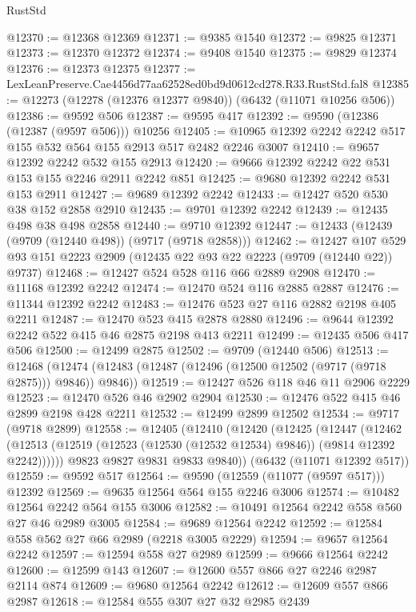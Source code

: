 \begin{lexlean}{RustStd}
\begin{coremodule}
@12370 := @12368 @12369
@12371 := @9385 @1540
@12372 := @9825 @12371
@12373 := @12370 @12372
@12374 := @9408 @1540
@12375 := @9829 @12374
@12376 := @12373 @12375
@12377 := LexLeanPreserve.Cae4456d77aa62528ed0bd9d0612cd278.R33.RustStd.fal8
@12385 := @12273 (@12278 (@12376 @12377 @9840)) (@6432 (@11071 @10256 @506))
@12386 := @9592 @506
@12387 := @9595 @417
@12392 := @9590 (@12386 (@12387 (@9597 @506))) @10256
@12405 := @10965 @12392 @2242 @2242 @517 @155 @532 @564 @155 @2913 @517 @2482 @2246 @3007
@12410 := @9657 @12392 @2242 @532 @155 @2913
@12420 := @9666 @12392 @2242 @22 @531 @153 @155 @2246 @2911 @2242 @851
@12425 := @9680 @12392 @2242 @531 @153 @2911
@12427 := @9689 @12392 @2242
@12433 := @12427 @520 @530 @38 @152 @2858 @2910
@12435 := @9701 @12392 @2242
@12439 := @12435 @498 @38 @498 @2858
@12440 := @9710 @12392
@12447 := @12433 (@12439 (@9709 (@12440 @498)) (@9717 (@9718 @2858)))
@12462 := @12427
    @107
    @529
    @93
    @151
    @2223
    @2909
    (@12435 @22 @93 @22 @2223 (@9709 (@12440 @22)) @9737)
@12468 := @12427 @524 @528 @116 @66 @2889 @2908
@12470 := @11168 @12392 @2242
@12474 := @12470 @524 @116 @2885 @2887
@12476 := @11344 @12392 @2242
@12483 := @12476 @523 @27 @116 @2882 @2198 @405 @2211
@12487 := @12470 @523 @415 @2878 @2880
@12496 := @9644 @12392 @2242 @522 @415 @46 @2875 @2198 @413 @2211
@12499 := @12435 @506 @417 @506
@12500 := @12499 @2875
@12502 := @9709 (@12440 @506)
@12513 := @12468
    (@12474 (@12483 (@12487 (@12496 (@12500 @12502 (@9717 (@9718 @2875))) @9846)) @9846))
@12519 := @12427 @526 @118 @46 @11 @2906 @2229
@12523 := @12470 @526 @46 @2902 @2904
@12530 := @12476 @522 @415 @46 @2899 @2198 @428 @2211
@12532 := @12499 @2899 @12502
@12534 := @9717 (@9718 @2899)
@12558 := @12405
    (@12410
      (@12420
        (@12425
          (@12447
            (@12462
              (@12513 (@12519 (@12523 (@12530 (@12532 @12534) @9846)) (@9814 @12392 @2242))))))
        @9823
        @9827
        @9831
        @9833
        @9840))
    (@6432 (@11071 @12392 @517))
@12559 := @9592 @517
@12564 := @9590 (@12559 (@11077 (@9597 @517))) @12392
@12569 := @9635 @12564 @564 @155 @2246 @3006
@12574 := @10482 @12564 @2242 @564 @155 @3006
@12582 := @10491 @12564 @2242 @558 @560 @27 @46 @2989 @3005
@12584 := @9689 @12564 @2242
@12592 := @12584 @558 @562 @27 @66 @2989 (@2218 @3005 @2229)
@12594 := @9657 @12564 @2242
@12597 := @12594 @558 @27 @2989
@12599 := @9666 @12564 @2242
@12600 := @12599 @143
@12607 := @12600 @557 @866 @27 @2246 @2987 @2114 @874
@12609 := @9680 @12564 @2242
@12612 := @12609 @557 @866 @2987
@12618 := @12584 @555 @307 @27 @32 @2985 @2439

\end{coremodule}
\end{lexlean}

